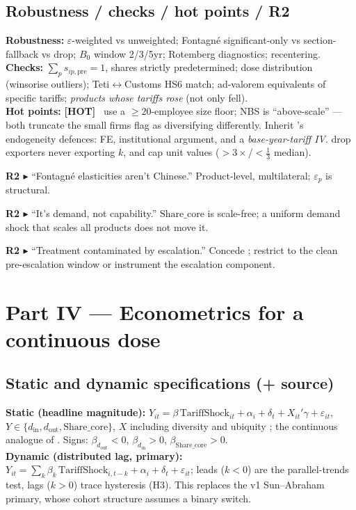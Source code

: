 \documentclass[11pt]{article}
\newcommand{\din}{d_{\mathrm{in}}}
\newcommand{\dout}{d_{\mathrm{out}}}
\newcommand{\sharecore}{\mathrm{Share\_core}}
\newcommand{\R}[1]{\par\smallskip\noindent\textbf{\textcolor{red!55!black}{R2 $\blacktriangleright$}} #1}
\newcommand{\HOT}{\textbf{\textcolor{red!60!black}{[HOT]}}\ }
\begin{document}
\subsection{Robustness / checks / hot points / R2}
\textbf{Robustness:} $\varepsilon$-weighted vs unweighted; Fontagn\'e significant-only
vs section-fallback vs drop; $B_0$ window 2/3/5yr; Rotemberg diagnostics; recentering.\\
\textbf{Checks:} $\sum_p s_{ip,\mathrm{pre}}{=}1$, shares strictly predetermined; dose
distribution (winsorise outliers); Teti$\leftrightarrow$Customs HS6 match; ad-valorem
equivalents of specific tariffs; \emph{products whose tariffs rose} (not only fell).\\
\textbf{Hot points:} \HOT \citet{amiti2007} use a $\ge20$-employee size floor; NBS is
``above-scale'' --- both truncate the small firms \citet{vannoorenberghe2016} flag as
diversifying differently. Inherit \citet{amiti2007}'s endogeneity defences: FE,
institutional argument, and a \emph{base-year-tariff IV}. \citet{fontagne2022} drop
exporters never exporting $k$, and cap unit values ($>3\times$/$<\tfrac13$ median).
\begin{ref2}
\R{``Fontagn\'e elasticities aren't Chinese.''} Product-level, multilateral; $\varepsilon_p$
is structural.
\R{``It's demand, not capability.''} $\sharecore$ is scale-free; a uniform demand shock
that scales all products does not move it.
\R{``Treatment contaminated by escalation.''} Concede \citep{evenett2024}; restrict to
the clean pre-escalation window or instrument the escalation component.
\end{ref2}

\section{Part IV --- Econometrics for a continuous dose}
\label{part:econ}

\subsection{Static and dynamic specifications (+ source)}
\textbf{Static (headline magnitude):}
$Y_{it}=\beta\,\mathrm{TariffShock}_{it}+\alpha_i+\delta_t+X_{it}'\gamma+\varepsilon_{it}$,
$Y\in\{\din,\dout,\sharecore\}$, $X$ including diversity and ubiquity
\citep{nomaler2023}; the continuous analogue of \citet{amiti2007,topalova2011}. Signs:
$\beta_{\dout}<0$, $\beta_{\din}>0$, $\beta_{\sharecore}>0$.\\[2pt]
\textbf{Dynamic (distributed lag, primary):}
$Y_{it}=\sum_{k}\beta_k\,\mathrm{TariffShock}_{i,t-k}+\alpha_i+\delta_t+\varepsilon_{it}$;
leads ($k<0$) are the parallel-trends test, lags ($k>0$) trace hysteresis (H3). This
replaces the v1 Sun--Abraham primary, whose cohort structure assumes a binary switch.
\end{document}
